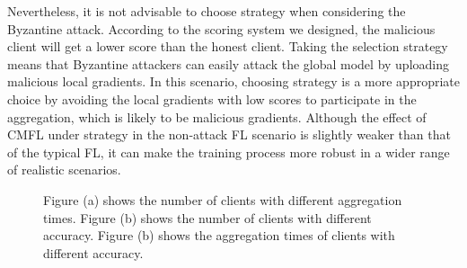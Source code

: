 \documentclass[10pt,journal,compsoc]{IEEEtran}
\begin{document}

Nevertheless, it is not advisable to choose strategy \uppercase\expandafter{} when considering the Byzantine attack. According to the scoring system we designed, the malicious client will get a lower score than the honest client. Taking the selection strategy \uppercase\expandafter{} means that Byzantine attackers can easily attack the global model by uploading malicious local gradients. In this scenario, choosing strategy \uppercase\expandafter{} is a more appropriate choice by avoiding the local gradients with low scores to participate in the aggregation, which is likely to be malicious gradients. Although the effect of CMFL under strategy \uppercase\expandafter{} in the non-attack FL scenario is slightly weaker than that of the typical FL, it can make the training process more robust in a wider range of realistic scenarios. 

\begin{figure*}[htbp]
  \centering
  
  
  \centering
  \caption{Figure (a) shows the number of clients with different aggregation times. Figure (b) shows the number of clients with different accuracy. Figure (b) shows the aggregation times of clients with different accuracy.}
  \label{fig:furtherAnalysis}
\end{figure*}
\end{document}
